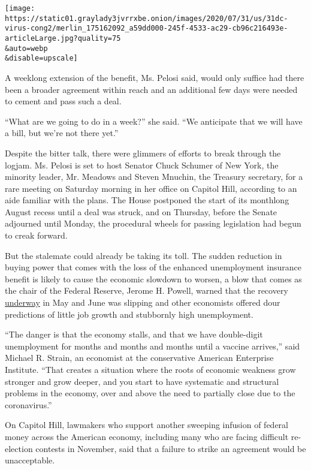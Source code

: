 \texttt{[image: https://static01.graylady3jvrrxbe.onion/images/2020/07/31/us/31dc-virus-cong2/merlin\_175162092\_a59dd000-245f-4533-ac29-cb96c216493e-articleLarge.jpg?quality=75\\\&auto=webp\\\&disable=upscale]}

A weeklong extension of the benefit, Ms. Pelosi said, would only suffice
had there been a broader agreement within reach and an additional few
days were needed to cement and pass such a deal.

``What are we going to do in a week?'' she said. ``We anticipate that we
will have a bill, but we're not there yet.''

Despite the bitter talk, there were glimmers of efforts to break through
the logjam. Ms. Pelosi is set to host Senator Chuck Schumer of New York,
the minority leader, Mr. Meadows and Steven Mnuchin, the Treasury
secretary, for a rare meeting on Saturday morning in her office on
Capitol Hill, according to an aide familiar with the plans. The House
postponed the start of its monthlong August recess until a deal was
struck, and on Thursday, before the Senate adjourned until Monday, the
procedural wheels for passing legislation had begun to creak forward.

But the stalemate could already be taking its toll. The sudden reduction
in buying power that comes with the loss of the enhanced unemployment
insurance benefit is likely to cause the economic slowdown to worsen, a
blow that comes as the chair of the Federal Reserve, Jerome H. Powell,
warned that the recovery
\href{https://www.nytimes3xbfgragh.onion/2020/07/29/business/economy/federal-reserve-meeting-interest-rates.html}{underway}
in May and June was slipping and other economists offered dour
predictions of little job growth and stubbornly high unemployment.

``The danger is that the economy stalls, and that we have double-digit
unemployment for months and months and months until a vaccine arrives,''
said Michael R. Strain, an economist at the conservative American
Enterprise Institute. ``That creates a situation where the roots of
economic weakness grow stronger and grow deeper, and you start to have
systematic and structural problems in the economy, over and above the
need to partially close due to the coronavirus.''

On Capitol Hill, lawmakers who support another sweeping infusion of
federal money across the American economy, including many who are facing
difficult re-election contests in November, said that a failure to
strike an agreement would be unacceptable.

